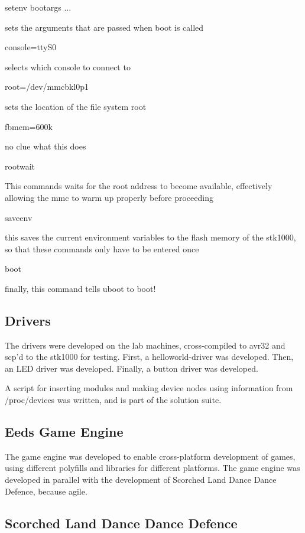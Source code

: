 setenv bootargs ...

sets the arguments that are passed when boot is called

console=ttyS0

selects which console to connect to

root=/dev/mmcbkl0p1

sets the location of the file system root

fbmem=600k

no clue what this does

rootwait

This commands waits for the root address to become available, effectively allowing the mmc to warm up properly before proceeding

saveenv

this saves the current environment variables to the flash memory of the stk1000, so that these commands only have to be entered once

boot

finally, this command tells uboot to boot!


\subsection{Drivers}

The drivers were developed on the lab machines, cross-compiled to avr32 and scp'd to the stk1000 for testing.
First, a helloworld-driver was developed.
Then, an LED driver was developed.
Finally, a button driver was developed.

A script for inserting modules and making device nodes using information from /proc/devices was written, and is part of the solution suite.


\subsection{Eeds Game Engine}

The game engine was developed to enable cross-platform development of games, using different polyfills and libraries for different platforms. The game engine was developed in parallel with the development of Scorched Land Dance Dance Defence, because agile.

\subsection{Scorched Land Dance Dance Defence}

